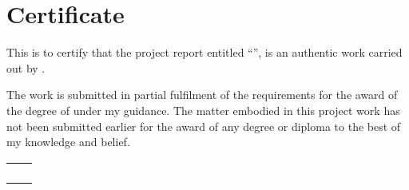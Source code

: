 \clearpage
\chapter*{Certificate}
\label{cha:certificate}
This is to certify that the project report entitled ``\projectTitle{}'', is an authentic work carried out by \authorsBold{}.

The work is submitted in partial fulfilment of the requirements for the award of the degree of \textit{\textbf{\degreeName{}}} under my guidance. The matter embodied in this project work has not been submitted earlier for the award of any degree or diploma to the best of my knowledge and belief.

\vfill

\begin{center}
    \begin{tabularx}{\textwidth}{L R}
         & \textbf{\mentorName{}}\\
                                    & \mentorJobTitle{}\\
                                    & \departmentName{}\\
                                    & \collegeName{}
    \end{tabularx}
\end{center}
